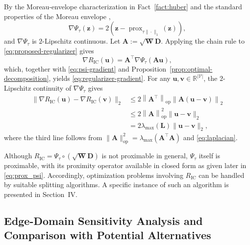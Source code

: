 \begin{IEEEproof}
By the Moreau-envelope characterization in Fact~\ref{fact:huber} and the standard properties of the Moreau envelope \cite[Prop.~12.30]{BauschkeCombettes2017},
\begin{equation}
\nabla\Psi_{\tau}(\mathbf{z})
=
2\left(
\mathbf{z}
-
\operatorname{prox}_{\tau\|\cdot\|_1}(\mathbf{z})
\right),
\label{eq:psi-gradient}
\end{equation}
and $\nabla\Psi_{\tau}$ is $2$-Lipschitz continuous.
Let $\mathbf{A}:=\sqrt{\mathbf{W}}\mathbf{D}$.
Applying the chain rule to \eqref{eq:proposed-regularizer} gives
\begin{equation}
\nabla R_{\mathrm{IC}}(\mathbf{u})
=
\mathbf{A}^{\top}
\nabla\Psi_{\tau}
\left(
\mathbf{A}\mathbf{u}
\right),
\end{equation}
which, together with \eqref{eq:psi-gradient} and Proposition~\ref{prop:optimal-decomposition}, yields \eqref{eq:regularizer-gradient}.
For any $\mathbf{u},\mathbf{v}\in\mathbb{R}^{|\mathcal{V}|}$, the $2$-Lipschitz continuity of $\nabla\Psi_{\tau}$ gives
\begin{align}
\|\nabla R_{\mathrm{IC}}(\mathbf{u})-\nabla R_{\mathrm{IC}}(\mathbf{v})\|_2
&\leq
2
\left\|
\mathbf{A}^{\top}
\right\|_{\mathrm{op}}
\left\|
\mathbf{A}(\mathbf{u}-\mathbf{v})
\right\|_2
\nonumber
\\
&\leq
2
\left\|
\mathbf{A}
\right\|_{\mathrm{op}}^2
\|\mathbf{u}-\mathbf{v}\|_2
\nonumber
\\
&=
2\lambda_{\max}(\mathbf{L})
\|\mathbf{u}-\mathbf{v}\|_2, 
\end{align}
where the third line follows from $\|\mathbf{A}\|_{\mathrm{op}}^2=\lambda_{\max}(\mathbf{A}^{\top}\mathbf{A})$ and \eqref{eq:laplacian}.
\end{IEEEproof}

\begin{remark}
\label{rem:proximability}
Although $R_{\mathrm{IC}}=\Psi_{\tau}\circ(\sqrt{\mathbf{W}}\mathbf{D})$ is not proximable in general, $\Psi_{\tau}$ itself is proximable, with its proximity operator available in closed form as given later in \eqref{eq:prox_psi}.
Accordingly, optimization problems involving $R_{\mathrm{IC}}$ can be handled by suitable splitting algorithms.
A specific instance of such an algorithm is presented in Section~IV.
\end{remark}


\subsection{Edge-Domain Sensitivity Analysis and Comparison with Potential Alternatives}
\label{subsec:alternatives}

